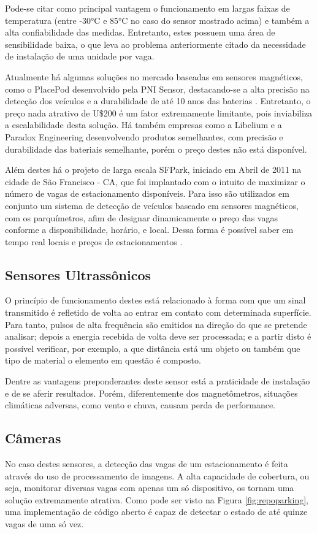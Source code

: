 \documentclass[oneside,openright,12pt]{ufsm_2015} %
\begin{document}
Pode-se citar como principal vantagem o funcionamento em largas faixas de temperatura (entre -30°C e 85°C no caso do sensor mostrado acima) e também a alta confiabilidade das medidas. Entretanto, estes possuem uma área de sensibilidade baixa, o que leva ao problema anteriormente citado da necessidade de instalação de uma unidade por vaga.

Atualmente há algumas soluções no mercado baseadas em sensores magnéticos, como o PlacePod desenvolvido pela PNI Sensor, destacando-se a alta precisão na detecção dos veículos e a durabilidade de até 10 anos das baterias \cite{placepod}. Entretanto, o preço nada atrativo de U\$200 é um fator extremamente limitante, pois inviabiliza a escalabilidade desta solução. Há também empresas como a Libelium e a Paradox Engineering desenvolvendo produtos semelhantes, com precisão e durabilidade das bateriais semelhante, porém o preço destes não está disponível.

Além destes há o projeto de larga escala SFPark, iniciado em Abril de 2011 na cidade de São Francisco - CA, que foi implantado com o intuito de maximizar o número de vagas de estacionamento disponíveis. Para isso são utilizados em conjunto um sistema de detecção de veículos baseado em sensores magnéticos, com os parquímetros, afim de designar dinamicamente o preço das vagas conforme a disponibilidade, horário, e local. Dessa forma é possível saber em tempo real locais e preços de estacionamentos \cite{site:mobilize}.


\subsection{Sensores Ultrassônicos}
O princípio de funcionamento destes está relacionado à forma com que um sinal transmitido é refletido de volta ao entrar em contato com determinada superfície. Para tanto, pulsos de alta frequência são emitidos na direção do que se pretende analisar; depois a energia recebida de volta deve ser processada; e a partir disto é possível verificar, por exemplo, a que distância está um objeto ou também que tipo de material o elemento em questão é composto.

Dentre as vantagens preponderantes deste sensor está a praticidade de instalação e de se aferir resultados. Porém, diferentemente dos magnetômetros, situações climáticas adversas, como vento e chuva, causam perda de performance.

\subsection{Câmeras}
No caso destes sensores, a detecção das vagas de um estacionamento é feita através do uso de processamento de imagens. A alta capacidade de cobertura, ou seja, monitorar diversas vagas com apenas um só dispositivo, os tornam uma solução extremamente atrativa. Como pode ser visto na Figura \ref{fig:repoparking}, uma implementação de código aberto é capaz de detectar o estado de até quinze vagas de uma só vez.
\end{document}
